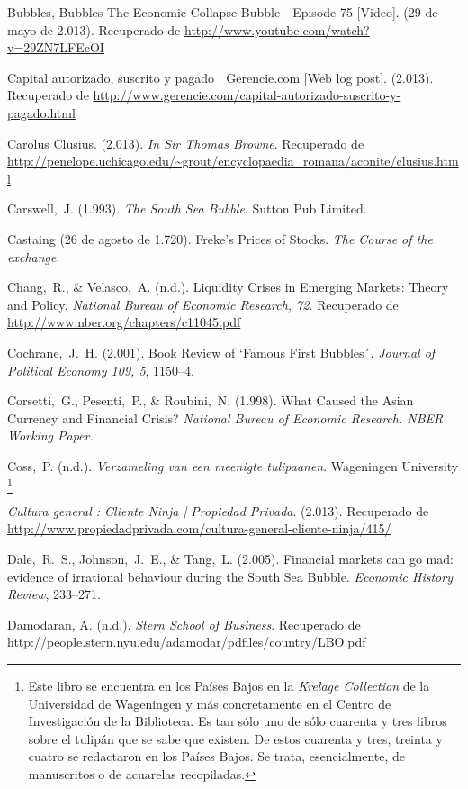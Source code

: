 \begin{thebibliography}{11}
	\bibitem{}
		Bubbles, Bubbles The Economic Collapse Bubble - Episode 75 [Video]. (29 de mayo de 2.013). Recuperado de \url{http://www.youtube.com/watch?v=29ZN7LFEcOI}

	\bibitem{}
		Capital autorizado, suscrito y pagado | Gerencie.com [Web log post]. (2.013). Recuperado de \url{http://www.gerencie.com/capital-autorizado-suscrito-y-pagado.html}

	\bibitem{}
		Carolus Clusius. (2.013). \emph{In Sir Thomas Browne}. Recuperado de \url{http://penelope.uchicago.edu/~grout/encyclopaedia\_romana/aconite/clusius.html}

	\bibitem{}
		Carswell, J. (1.993). \emph{The South Sea Bubble}. Sutton Pub Limited.

	\bibitem{}
		Castaing (26 de agosto de 1.720). Freke’s Prices of Stocks. \emph{The Course of the exchange}. 	

	\bibitem{}
		Chang, R., \& Velasco, A. (n.d.). Liquidity Crises in Emerging Markets: Theory and Policy. \emph{National Bureau of Economic Research, 72}. Recuperado de  \url{http://www.nber.org/chapters/c11045.pdf}

	\bibitem{}
		Cochrane, J. H. (2.001). Book Review of `Famous First Bubbles´. \emph{Journal of Political Economy 109, 5}, 1150–4. 	

	\bibitem{}
		Corsetti, G., Pesenti, P., \& Roubini, N. (1.998). What Caused the Asian Currency and Financial Crisis? \emph{National Bureau of Economic Research. NBER Working Paper}. 

	\bibitem{}
		Coss, P. (n.d.). \emph{Verzameling van een meenigte tulipaanen}. Wageningen University	\footnote{Este libro se encuentra en los Países Bajos en la \emph{Krelage Collection} de la Universidad de Wageningen y más concretamente en el Centro de Investigación de la Biblioteca. Es tan sólo uno de sólo cuarenta y tres libros sobre el tulipán que se sabe que existen. De estos cuarenta y tres, treinta y cuatro se redactaron en los Países Bajos. Se trata, esencialmente, de manuscritos o de acuarelas recopiladas.}

	\bibitem{}
		\emph{Cultura general : Cliente Ninja | Propiedad Privada}. (2.013). Recuperado de \url{http://www.propiedadprivada.com/cultura-general-cliente-ninja/415/}

	\bibitem{}
		Dale, R. S., Johnson, J. E., \& Tang, L. (2.005). Financial markets can go mad: evidence of irrational behaviour during the South Sea Bubble. \emph{Economic History Review}, 233–271.	

	\bibitem{}
		Damodaran, A. (n.d.). \emph{Stern School of Business}. Recuperado de \url{http://people.stern.nyu.edu/adamodar/pdfiles/country/LBO.pdf}


\end{thebibliography}
